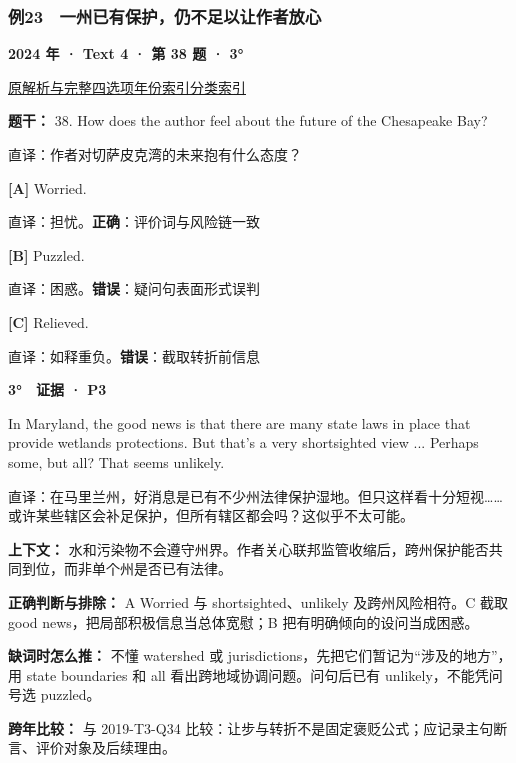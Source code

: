 \documentclass[11pt,a4paper]{article}
\begin{document}
\subsubsection{例23　一州已有保护，仍不足以让作者放心}\label{case-2024-T4-Q38}
\noindent\textbf{2024 年 · Text 4 · 第 38 题 · 3°}\par\noindent \href{https://zj139.github.io/math-notes/english/205b52b675af679e70500e87/\#q38}{原解析与完整四选项}\quad \hyperref[idx-2024-T4-Q38]{年份索引}\quad \hyperref[class-R10]{分类索引}\par\smallskip
\noindent\textbf{题干：} 38. How does the author feel about the future of the Chesapeake Bay?\par\smallskip
直译：作者对切萨皮克湾的未来抱有什么态度？

\noindent\textbf{[A]} Worried.\par\nopagebreak
\noindent 直译：担忧。\quad\textbf{正确}：评价词与风险链一致\par\smallskip
{}\noindent\textbf{[B]} Puzzled.\par\nopagebreak
\noindent 直译：困惑。\quad\textbf{错误}：疑问句表面形式误判\par\smallskip
{}\noindent\textbf{[C]} Relieved.\par\nopagebreak
\noindent 直译：如释重负。\quad\textbf{错误}：截取转折前信息\par\smallskip
\begin{evidence}\textbf{3°　证据 · P3}\par In Maryland, the good news is that there are many state laws in place that provide wetlands protections. But that’s a very shortsighted view ... Perhaps some, but all? That seems unlikely.\par 直译：在马里兰州，好消息是已有不少州法律保护湿地。但只这样看十分短视……或许某些辖区会补足保护，但所有辖区都会吗？这似乎不太可能。\end{evidence}
\noindent\textbf{上下文：} 水和污染物不会遵守州界。作者关心联邦监管收缩后，跨州保护能否共同到位，而非单个州是否已有法律。\par\smallskip
\noindent\textbf{正确判断与排除：} A Worried 与 shortsighted、unlikely 及跨州风险相符。C 截取 good news，把局部积极信息当总体宽慰；B 把有明确倾向的设问当成困惑。\par\smallskip
\noindent\textbf{缺词时怎么推：} 不懂 watershed 或 jurisdictions，先把它们暂记为“涉及的地方”，用 state boundaries 和 all 看出跨地域协调问题。问句后已有 unlikely，不能凭问号选 puzzled。\par\smallskip
\noindent\textbf{跨年比较：} 与 2019-T3-Q34 比较：让步与转折不是固定褒贬公式；应记录主句断言、评价对象及后续理由。\par\smallskip
\clearpage
\end{document}
